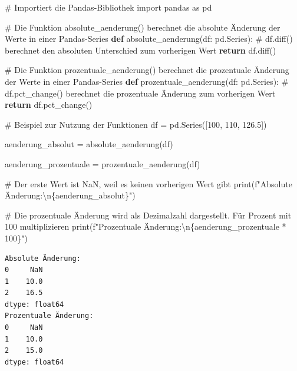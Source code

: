 \documentclass[
  ngerman,
  a4paper,
  DIV=11,
  oneside]{scrreprt}
\newenvironment{Shaded}{\begin{snugshade}}{\end{snugshade}}
\newcommand{\BuiltInTok}[1]{\textcolor[rgb]{0.00,0.23,0.31}{#1}}
\newcommand{\CharTok}[1]{\textcolor[rgb]{0.13,0.47,0.30}{#1}}
\newcommand{\CommentTok}[1]{\textcolor[rgb]{0.37,0.37,0.37}{#1}}
\newcommand{\ControlFlowTok}[1]{\textcolor[rgb]{0.00,0.23,0.31}{\textbf{#1}}}
\newcommand{\DecValTok}[1]{\textcolor[rgb]{0.68,0.00,0.00}{#1}}
\newcommand{\FloatTok}[1]{\textcolor[rgb]{0.68,0.00,0.00}{#1}}
\newcommand{\ImportTok}[1]{\textcolor[rgb]{0.00,0.46,0.62}{#1}}
\newcommand{\KeywordTok}[1]{\textcolor[rgb]{0.00,0.23,0.31}{\textbf{#1}}}
\newcommand{\NormalTok}[1]{\textcolor[rgb]{0.00,0.23,0.31}{#1}}
\newcommand{\OperatorTok}[1]{\textcolor[rgb]{0.37,0.37,0.37}{#1}}
\newcommand{\SpecialCharTok}[1]{\textcolor[rgb]{0.37,0.37,0.37}{#1}}
\newcommand{\SpecialStringTok}[1]{\textcolor[rgb]{0.13,0.47,0.30}{#1}}
\begin{document}
\begin{Shaded}
\begin{Highlighting}[]
\CommentTok{\# Importiert die Pandas{-}Bibliothek}
\ImportTok{import}\NormalTok{ pandas }\ImportTok{as}\NormalTok{ pd}

\CommentTok{\# Die Funktion absolute\_aenderung() berechnet die absolute Änderung der Werte in einer Pandas{-}Series}
\KeywordTok{def}\NormalTok{ absolute\_aenderung(df: pd.Series):}
    \CommentTok{\# df.diff() berechnet den absoluten Unterschied zum vorherigen Wert}
    \ControlFlowTok{return}\NormalTok{ df.diff()}

\CommentTok{\# Die Funktion prozentuale\_aenderung() berechnet die prozentuale Änderung der Werte in einer Pandas{-}Series}
\KeywordTok{def}\NormalTok{ prozentuale\_aenderung(df: pd.Series):}
    \CommentTok{\# df.pct\_change() berechnet die prozentuale Änderung zum vorherigen Wert}
    \ControlFlowTok{return}\NormalTok{ df.pct\_change()}

\CommentTok{\# Beispiel zur Nutzung der Funktionen}
\NormalTok{df }\OperatorTok{=}\NormalTok{ pd.Series([}\DecValTok{100}\NormalTok{, }\DecValTok{110}\NormalTok{, }\FloatTok{126.5}\NormalTok{])}

\NormalTok{aenderung\_absolut }\OperatorTok{=}\NormalTok{ absolute\_aenderung(df)}

\NormalTok{aenderung\_prozentuale }\OperatorTok{=}\NormalTok{ prozentuale\_aenderung(df)}

\CommentTok{\# Der erste Wert ist NaN, weil es keinen vorherigen Wert gibt}
\BuiltInTok{print}\NormalTok{(}\SpecialStringTok{f"Absolute Änderung:}\CharTok{\textbackslash{}n}\SpecialCharTok{\{}\NormalTok{aenderung\_absolut}\SpecialCharTok{\}}\SpecialStringTok{"}\NormalTok{)}

\CommentTok{\# Die prozentuale Änderung wird als Dezimalzahl dargestellt. Für Prozent mit 100 multiplizieren}
\BuiltInTok{print}\NormalTok{(}\SpecialStringTok{f"Prozentuale Änderung:}\CharTok{\textbackslash{}n}\SpecialCharTok{\{}\NormalTok{aenderung\_prozentuale }\OperatorTok{*} \DecValTok{100}\SpecialCharTok{\}}\SpecialStringTok{"}\NormalTok{)}
\end{Highlighting}
\end{Shaded}

\begin{verbatim}
Absolute Änderung:
0     NaN
1    10.0
2    16.5
dtype: float64
Prozentuale Änderung:
0     NaN
1    10.0
2    15.0
dtype: float64
\end{verbatim}
\end{document}
